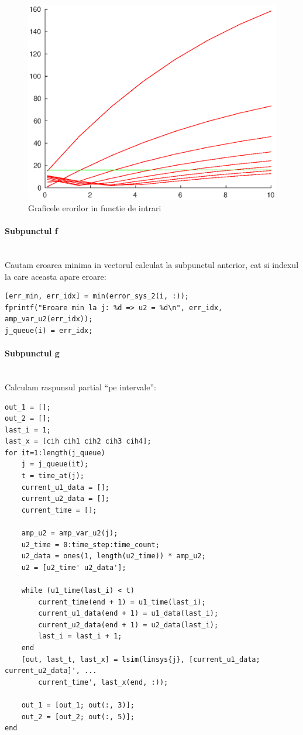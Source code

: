 \documentclass[12pt,english]{article}
\newcommand{\myparagraph}[1]{\paragraph{#1}\mbox{}\\}
\begin{document}
\begin{figure} [H]
	\includegraphics[width=1\textwidth]{e_1.eps}
	\caption{Graficele erorilor in functie de intrari}
\end{figure}

\pagebreak
\myparagraph {Subpunctul f}
Cautam eroarea minima in vectorul calculat la subpunctul anterior, cat si indexul la care aceasta apare eroare:

\begin{verbatim}
[err_min, err_idx] = min(error_sys_2(i, :));
fprintf("Eroare min la j: %d => u2 = %d\n", err_idx, amp_var_u2(err_idx));
j_queue(i) = err_idx;
\end{verbatim}

\myparagraph {Subpunctul g}
Calculam raspunsul partial ``pe intervale'':

\begin{verbatim}
out_1 = [];
out_2 = [];
last_i = 1;
last_x = [cih cih1 cih2 cih3 cih4];
for it=1:length(j_queue)
	j = j_queue(it);
	t = time_at(j);
	current_u1_data = [];
	current_u2_data = [];
	current_time = [];

	amp_u2 = amp_var_u2(j);
	u2_time = 0:time_step:time_count;
	u2_data = ones(1, length(u2_time)) * amp_u2;
	u2 = [u2_time' u2_data'];

	while (u1_time(last_i) < t)
		current_time(end + 1) = u1_time(last_i);
		current_u1_data(end + 1) = u1_data(last_i);
		current_u2_data(end + 1) = u2_data(last_i);
		last_i = last_i + 1;
	end
	[out, last_t, last_x] = lsim(linsys{j}, [current_u1_data; current_u2_data]', ...
		current_time', last_x(end, :));

	out_1 = [out_1; out(:, 3)];
	out_2 = [out_2; out(:, 5)];
end
\end{verbatim}
\end{document}

